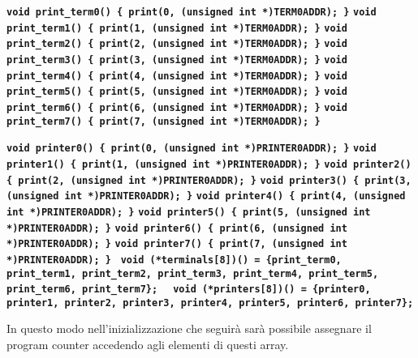 \documentclass{article}
\begin{document}
\texttt{\textbf{void print\_term0() \{ print(0, (unsigned int *)TERM0ADDR); \}}}
\newline
\texttt{\textbf{void print\_term1() \{ print(1, (unsigned int *)TERM0ADDR); \}}}
\newline
\texttt{\textbf{void print\_term2() \{ print(2, (unsigned int *)TERM0ADDR); \}}}
\newline
\texttt{\textbf{void print\_term3() \{ print(3, (unsigned int *)TERM0ADDR); \}}}
\newline
\texttt{\textbf{void print\_term4() \{ print(4, (unsigned int *)TERM0ADDR); \}}}
\newline
\texttt{\textbf{void print\_term5() \{ print(5, (unsigned int *)TERM0ADDR); \}}}
\newline
\texttt{\textbf{void print\_term6() \{ print(6, (unsigned int *)TERM0ADDR); \}}}
\newline
\texttt{\textbf{void print\_term7() \{ print(7, (unsigned int *)TERM0ADDR); \}}}
\newline

\texttt{\textbf{void printer0() \{ print(0, (unsigned int *)PRINTER0ADDR); \}}}
\newline
\texttt{\textbf{void printer1() \{ print(1, (unsigned int *)PRINTER0ADDR); \}}}
\newline
\texttt{\textbf{void printer2() \{ print(2, (unsigned int *)PRINTER0ADDR); \}}}
\newline
\texttt{\textbf{void printer3() \{ print(3, (unsigned int *)PRINTER0ADDR); \}}}
\newline
\texttt{\textbf{void printer4() \{ print(4, (unsigned int *)PRINTER0ADDR); \}}}
\newline
\texttt{\textbf{void printer5() \{ print(5, (unsigned int *)PRINTER0ADDR); \}}}
\newline
\texttt{\textbf{void printer6() \{ print(6, (unsigned int *)PRINTER0ADDR); \}}}
\newline
\texttt{\textbf{void printer7() \{ print(7, (unsigned int *)PRINTER0ADDR); \}}}\newline\newline
\texttt{\textbf{
void (*terminals[8])() = \{print\_term0, print\_term1, print\_term2, print\_term3,
print\_term4, print\_term5, print\_term6, print\_term7\}; }}
\newline
\texttt{\textbf{
void (*printers[8])() = \{printer0, printer1, printer2, printer3,
printer4, printer5, printer6, printer7\};}}

In questo modo nell'inizializzazione che seguirà sarà possibile assegnare il program counter 
accedendo agli elementi di questi array.
\end{document}
